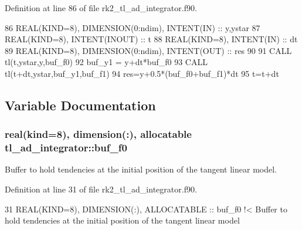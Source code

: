 Definition at line 86 of file rk2\+\_\+tl\+\_\+ad\+\_\+integrator.\+f90.


\begin{DoxyCode}
86     \textcolor{keywordtype}{REAL(KIND=8)}, \textcolor{keywordtype}{DIMENSION(0:ndim)}, \textcolor{keywordtype}{INTENT(IN)} :: y,ystar
87     \textcolor{keywordtype}{REAL(KIND=8)}, \textcolor{keywordtype}{INTENT(INOUT)} :: t
88     \textcolor{keywordtype}{REAL(KIND=8)}, \textcolor{keywordtype}{INTENT(IN)} :: dt
89     \textcolor{keywordtype}{REAL(KIND=8)}, \textcolor{keywordtype}{DIMENSION(0:ndim)}, \textcolor{keywordtype}{INTENT(OUT)} :: res
90 
91     \textcolor{keyword}{CALL }tl(t,ystar,y,buf\_f0)
92     buf\_y1 = y+dt*buf\_f0
93     \textcolor{keyword}{CALL }tl(t+dt,ystar,buf\_y1,buf\_f1)
94     res=y+0.5*(buf\_f0+buf\_f1)*dt
95     t=t+dt
\end{DoxyCode}


\subsection{Variable Documentation}
\subsubsection[{\texorpdfstring{buf\+\_\+f0}{buf_f0}}]{\setlength{\rightskip}{0pt plus 5cm}real(kind=8), dimension(\+:), allocatable tl\+\_\+ad\+\_\+integrator\+::buf\+\_\+f0\hspace{0.3cm}{\ttfamily [private]}}\hypertarget{namespacetl__ad__integrator_ad0e2f29027e4317cae009ca0c4ad1b5a}{}\label{namespacetl__ad__integrator_ad0e2f29027e4317cae009ca0c4ad1b5a}


Buffer to hold tendencies at the initial position of the tangent linear model. 



Definition at line 31 of file rk2\+\_\+tl\+\_\+ad\+\_\+integrator.\+f90.


\begin{DoxyCode}
31   \textcolor{keywordtype}{REAL(KIND=8)}, \textcolor{keywordtype}{DIMENSION(:)}, \textcolor{keywordtype}{ALLOCATABLE} :: buf\_f0\textcolor{comment}{ !< Buffer to hold tendencies at the initial position of
       the tangent linear model}
\end{DoxyCode}
